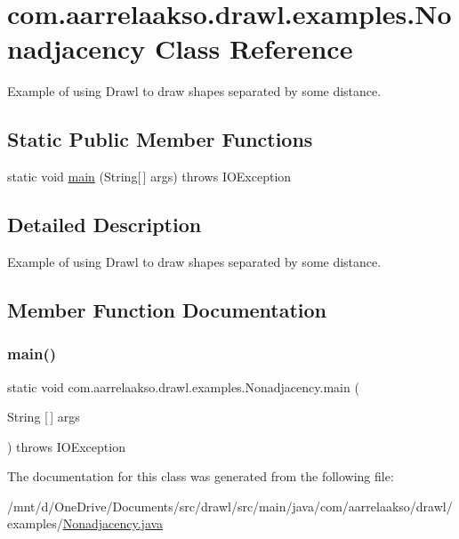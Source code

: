 \hypertarget{classcom_1_1aarrelaakso_1_1drawl_1_1examples_1_1_nonadjacency}{}\section{com.\+aarrelaakso.\+drawl.\+examples.\+Nonadjacency Class Reference}
\label{classcom_1_1aarrelaakso_1_1drawl_1_1examples_1_1_nonadjacency}


Example of using Drawl to draw shapes separated by some distance.  


\subsection*{Static Public Member Functions}
\begin{DoxyCompactItemize}
\item 
static void \hyperlink{classcom_1_1aarrelaakso_1_1drawl_1_1examples_1_1_nonadjacency_a41d8f11e6e03cf95442b5149f2848183}{main} (String\mbox{[}$\,$\mbox{]} args)  throws I\+O\+Exception     
\end{DoxyCompactItemize}


\subsection{Detailed Description}
Example of using Drawl to draw shapes separated by some distance. 

\subsection{Member Function Documentation}
\mbox{\label{classcom_1_1aarrelaakso_1_1drawl_1_1examples_1_1_nonadjacency_a41d8f11e6e03cf95442b5149f2848183}} 
\subsubsection{\texorpdfstring{main()}{main()}}
{\footnotesize\ttfamily static void com.\+aarrelaakso.\+drawl.\+examples.\+Nonadjacency.\+main (\begin{DoxyParamCaption}\item[{String \mbox{[}$\,$\mbox{]}}]{args }\end{DoxyParamCaption}) throws I\+O\+Exception\hspace{0.3cm}{\ttfamily [static]}}



The documentation for this class was generated from the following file\+:\begin{DoxyCompactItemize}
\item 
/mnt/d/\+One\+Drive/\+Documents/src/drawl/src/main/java/com/aarrelaakso/drawl/examples/\hyperlink{_nonadjacency_8java}{Nonadjacency.\+java}\end{DoxyCompactItemize}
